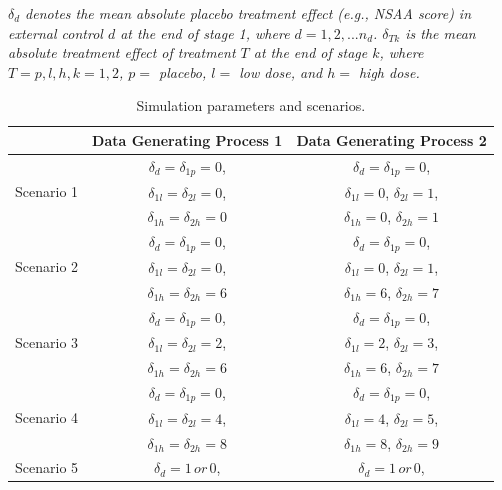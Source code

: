 \begin{table}
\caption{Simulation parameters and scenarios.\label{tab:simulation_settings}}
\begin{center}
\vspace{-5mm}
\begin{tablenotes}  
    \small
     \textit{$\delta_{d}$ denotes the mean absolute placebo treatment effect (e.g., NSAA score) in external control $d$ at the end of stage 1, where $d = 1,2,...n_d$. $\delta_{Tk}$ is the mean absolute treatment effect of treatment $T$ at the end of stage $k$, where $T = p,l,h, k = 1,2$, $p = $ placebo, $l = $ low dose, and $h = $ high dose. }\\
     \vspace{2.5mm}
\end{tablenotes}
\begin{tabular}{ccc}
  &  Data Generating Process 1 &  Data Generating Process 2 \tabularnewline
\hline
\multirow{3}{4.5em}{Scenario 1} & $\delta_d = \delta_{1p} = 0$, & $\delta_d = \delta_{1p} = 0$,\\
 & $\delta_{1l} = \delta_{2l} = 0$, & $\delta_{1l} = 0$, $\delta_{2l} = 1$, \\
 & $\delta_{1h} = \delta_{2h} = 0$ & $\delta_{1h} = 0$, $\delta_{2h} = 1$\\  
\hline
\multirow{3}{4.5em}{Scenario 2} & $\delta_d = \delta_{1p} = 0$, & $\delta_d = \delta_{1p} = 0$,\\
 & $\delta_{1l} = \delta_{2l} = 0$, & $\delta_{1l} = 0$, $\delta_{2l} = 1$, \\
 & $\delta_{1h} = \delta_{2h} = 6$ & $\delta_{1h} = 6$, $\delta_{2h} = 7$\\  
\hline
\multirow{3}{4.5em}{Scenario 3} & $\delta_d = \delta_{1p} = 0$, & $\delta_d = \delta_{1p} = 0$,\\
 & $\delta_{1l} = \delta_{2l} = 2$, & $\delta_{1l} = 2$, $\delta_{2l} = 3$, \\
 & $\delta_{1h} = \delta_{2h} = 6$ & $\delta_{1h} = 6$, $\delta_{2h} = 7$\\  
\hline
\multirow{3}{4.5em}{Scenario 4} & $\delta_d = \delta_{1p} = 0$, & $\delta_d = \delta_{1p} = 0$,\\
 & $\delta_{1l} = \delta_{2l} = 4$, & $\delta_{1l} = 4$, $\delta_{2l} = 5$, \\
 & $\delta_{1h} = \delta_{2h} = 8$ & $\delta_{1h} = 8$, $\delta_{2h} = 9$\\  
\hline
\multirow{5}{4.5em}{Scenario 5} & $\delta_d = 1\, or\, 0$, & $\delta_d = 1\, or\, 0$, \\

\end{tabular}
\end{center}
\end{table}
